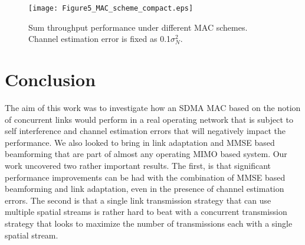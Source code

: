 \documentclass[journal, final]{IEEEtran}
\begin{document}
\begin{figure}
\centering
\texttt{[image: Figure5\_MAC\_scheme\_compact.eps]}
\caption{Sum throughput performance under different MAC schemes. Channel estimation error is fixed as 0.1$\sigma_N^2$.}
\label{Fig5_MAC_scheme}
\end{figure}

\section{Conclusion}

The aim of this work was to investigate how an SDMA MAC based on the notion of concurrent links would perform in a real operating network that is subject to self interference and channel estimation errors that will negatively impact the performance. We also looked to bring in link adaptation and MMSE based beamforming that are part of almost any operating MIMO based system. Our work uncovered two rather important results. The first, is that significant performance improvements can be had with the combination of MMSE based beamforming and link adaptation, even in the presence of channel estimation errors. The second
is that a single link transmission strategy that can use multiple spatial streams is rather hard to beat with a concurrent transmission strategy that looks to maximize the number of transmissions each with a single spatial stream.





















\ifCLASSOPTIONcaptionsoff
  \newpage
\fi















\end{document}

